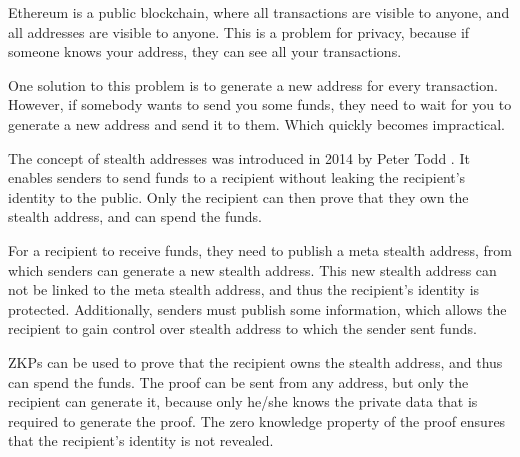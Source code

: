 Ethereum is a public blockchain, where all transactions are visible to anyone,
and all addresses are visible to anyone. This is a problem for privacy, because
if someone knows your address, they can see all your transactions.

One solution to this problem is to generate a new address for every transaction.
However, if somebody wants to send you some funds, they need to wait for you to
generate a new address and send it to them. Which quickly becomes impractical.

The concept of stealth addresses was introduced in 2014 by Peter Todd \cite{ToddStealthAddresses}.
It enables senders to send funds to a recipient without leaking the recipient's
identity to the public. Only the recipient can then prove that they own the stealth
address, and can spend the funds.

For a recipient to receive funds, they need to publish a meta stealth address,
from which senders can generate a new stealth address. This new stealth address
can not be linked to the meta stealth address, and thus the recipient's identity
is protected. Additionally, senders must publish some information, which allows
the recipient to gain control over stealth address to which the sender
sent funds\cite{Yu2020}.

ZKPs can be used to prove that the recipient owns the stealth address, and
thus can spend the funds. The proof can be sent from any address, but only
the recipient can generate it, because only he/she knows the private data
that is required to generate the proof. The zero knowledge property of the
proof ensures that the recipient's identity is not revealed.


